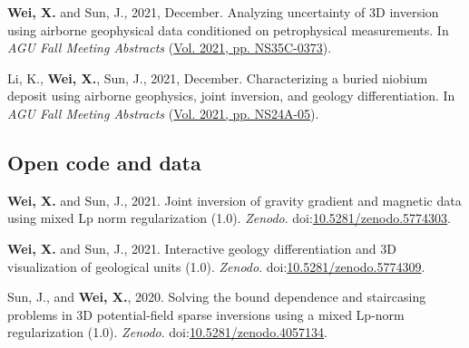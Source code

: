 \documentclass[11pt, a4paper]{article}
\newcommand{\LastName}{Wei}
\newcommand{\Initials}{X}
\newcommand{\Wei}{\textbf{\LastName, \Initials.}}  %
\newcommand{\WeiSun}{\textbf{\LastName, \Initials.} and Sun, J.}  %
\newcommand{\DOI}[1]{doi:\href{https://doi.org/#1}{#1}}
\begin{document}
\begin{etaremune}
	\item
	\WeiSun, 2021, December. Analyzing uncertainty of 3D inversion using airborne geophysical data conditioned on petrophysical measurements. In \emph{AGU Fall Meeting Abstracts} (\href{https://ui.adsabs.harvard.edu/abs/2021AGUFMNS35C0373W/abstract}{Vol. 2021, pp. NS35C-0373}).

	\item
	Li, K., \Wei, Sun, J., 2021, December. Characterizing a buried niobium deposit using airborne geophysics, joint inversion, and geology differentiation. In \emph{AGU Fall Meeting Abstracts} (\href{https://ui.adsabs.harvard.edu/abs/2021AGUFMNS24A..05L/abstract}{Vol. 2021, pp. NS24A-05}).

\end{etaremune}


\subsection*{Open code and data}
\begin{etaremune}

	\item
	\WeiSun, 2021. Joint inversion of gravity gradient and magnetic data using mixed Lp norm regularization (1.0). \emph{Zenodo}. \DOI{10.5281/zenodo.5774303}.

	\item
	\WeiSun, 2021. Interactive geology differentiation and 3D visualization of geological units (1.0). \emph{Zenodo}. \DOI{10.5281/zenodo.5774309}.

	\item
	Sun, J., and \Wei, 2020. Solving the bound dependence and staircasing problems in 3D potential-field sparse inversions using a mixed Lp-norm regularization (1.0). \emph{Zenodo}. \DOI{10.5281/zenodo.4057134}.

\end{etaremune}


\end{document}
